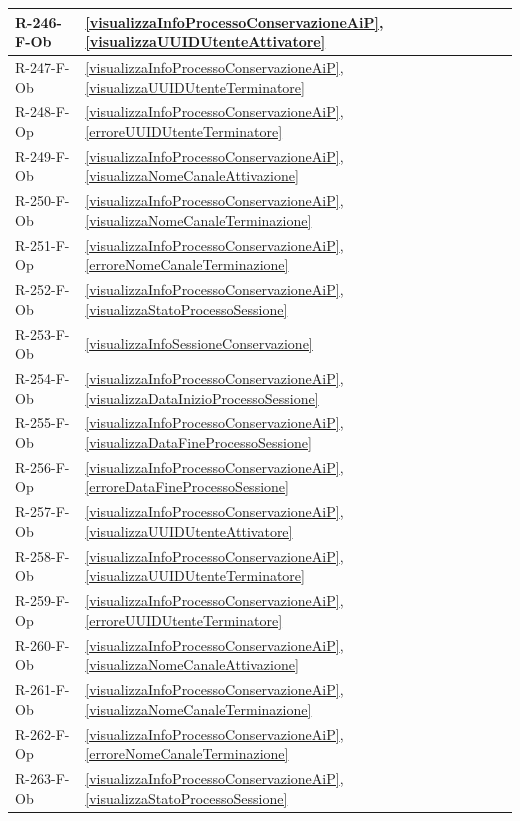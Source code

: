 \begin{longtable}{|p{4cm}|p{10cm}|}
\hline
R-246-F-Ob & \ref{visualizzaInfoProcessoConservazioneAiP}, \ref{visualizzaUUIDUtenteAttivatore} \\
\hline
R-247-F-Ob & \ref{visualizzaInfoProcessoConservazioneAiP}, \ref{visualizzaUUIDUtenteTerminatore} \\
\hline
R-248-F-Op & \ref{visualizzaInfoProcessoConservazioneAiP}, \ref{erroreUUIDUtenteTerminatore} \\
\hline
R-249-F-Ob & \ref{visualizzaInfoProcessoConservazioneAiP}, \ref{visualizzaNomeCanaleAttivazione} \\
\hline
R-250-F-Ob & \ref{visualizzaInfoProcessoConservazioneAiP}, \ref{visualizzaNomeCanaleTerminazione} \\
\hline
R-251-F-Op & \ref{visualizzaInfoProcessoConservazioneAiP}, \ref{erroreNomeCanaleTerminazione} \\
\hline
R-252-F-Ob & \ref{visualizzaInfoProcessoConservazioneAiP}, \ref{visualizzaStatoProcessoSessione} \\
\hline
R-253-F-Ob & \ref{visualizzaInfoSessioneConservazione} \\
\hline
R-254-F-Ob & \ref{visualizzaInfoProcessoConservazioneAiP}, \ref{visualizzaDataInizioProcessoSessione} \\
\hline
R-255-F-Ob & \ref{visualizzaInfoProcessoConservazioneAiP}, \ref{visualizzaDataFineProcessoSessione} \\
\hline
R-256-F-Op & \ref{visualizzaInfoProcessoConservazioneAiP}, \ref{erroreDataFineProcessoSessione} \\
\hline
R-257-F-Ob & \ref{visualizzaInfoProcessoConservazioneAiP}, \ref{visualizzaUUIDUtenteAttivatore} \\
\hline
R-258-F-Ob & \ref{visualizzaInfoProcessoConservazioneAiP}, \ref{visualizzaUUIDUtenteTerminatore} \\
\hline
R-259-F-Op & \ref{visualizzaInfoProcessoConservazioneAiP}, \ref{erroreUUIDUtenteTerminatore} \\
\hline
R-260-F-Ob & \ref{visualizzaInfoProcessoConservazioneAiP}, \ref{visualizzaNomeCanaleAttivazione} \\
\hline
R-261-F-Ob & \ref{visualizzaInfoProcessoConservazioneAiP}, \ref{visualizzaNomeCanaleTerminazione} \\
\hline
R-262-F-Op & \ref{visualizzaInfoProcessoConservazioneAiP}, \ref{erroreNomeCanaleTerminazione} \\
\hline
R-263-F-Ob & \ref{visualizzaInfoProcessoConservazioneAiP}, \ref{visualizzaStatoProcessoSessione} \\
\hline

\end{longtable}
